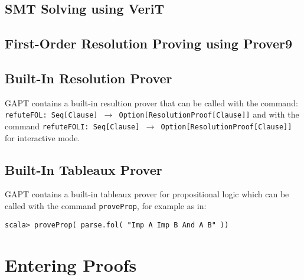 \documentclass[a4paper,11pt]{article}
\begin{document}
\subsection{SMT Solving using VeriT}

\subsection{First-Order Resolution Proving using Prover9}

\subsection{Built-In Resolution Prover}

GAPT contains a built-in resultion prover that can be called with the command:
\texttt{refuteFOL: Seq[Clause] $\rightarrow$ Option[ResolutionProof[Clause]]}
and with the command
\texttt{refuteFOLI: Seq[Clause] $\rightarrow$ Option[ResolutionProof[Clause]]}
for interactive mode.

\subsection{Built-In Tableaux Prover}

GAPT contains a  built-in tableaux prover for propositional logic
which can be called with the command \texttt{proveProp}, for example as in:
\begin{lstlisting}
scala> proveProp( parse.fol( "Imp A Imp B And A B" ))
\end{lstlisting}

\section{Entering Proofs}
\end{document}
